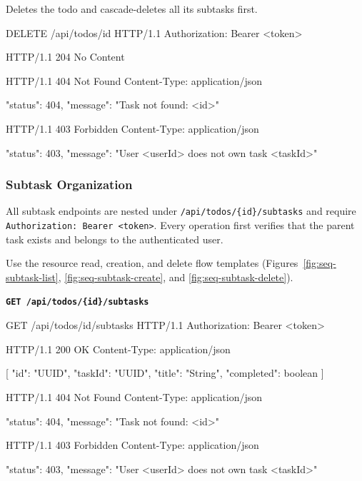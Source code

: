 \noindent Deletes the todo and cascade-deletes all its subtasks first.

\begin{httpexchange}
\begin{httplisting}
DELETE /api/todos/{id} HTTP/1.1
Authorization: Bearer <token>
\end{httplisting}
\httpmidarrows
\begin{httplisting}
HTTP/1.1 204 No Content

HTTP/1.1 404 Not Found
Content-Type: application/json

{
    "status": 404,
    "message": "Task not found: <id>"
}

HTTP/1.1 403 Forbidden
Content-Type: application/json

{
    "status": 403,
    "message": "User <userId> does not own task <taskId>"
}
\end{httplisting}
\end{httpexchange}




\newpage



\subsubsection{Subtask Organization}
All subtask endpoints are nested under \texttt{/api/todos/\{id\}/subtasks} and require
\texttt{Authorization: Bearer <token>}. Every operation first verifies that the parent task
exists and belongs to the authenticated user.


Use the resource read, creation, and delete flow templates
(Figures~\ref{fig:seq-subtask-list}, \ref{fig:seq-subtask-create}, and \ref{fig:seq-subtask-delete}).

\textbf{\texttt{GET /api/todos/\{id\}/subtasks}}

\begin{httpexchange}
\begin{httplisting}
GET /api/todos/{id}/subtasks HTTP/1.1
Authorization: Bearer <token>
\end{httplisting}
\httpmidarrows
\begin{httplisting}
HTTP/1.1 200 OK
Content-Type: application/json

[
    {
        "id": "UUID",
        "taskId": "UUID",
        "title": "String",
        "completed": boolean
    }
]

HTTP/1.1 404 Not Found
Content-Type: application/json

{
    "status": 404,
    "message": "Task not found: <id>"
}

HTTP/1.1 403 Forbidden
Content-Type: application/json

{
    "status": 403,
    "message": "User <userId> does not own task <taskId>"
}
\end{httplisting}
\end{httpexchange}

